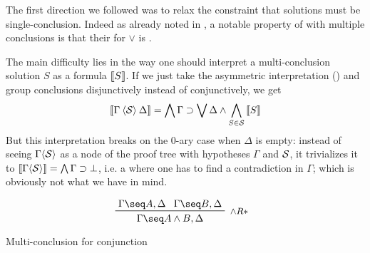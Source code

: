 \begin{scope}
The first direction we followed was to relax the constraint that solutions must
be single-conclusion. Indeed as already noted in , a
notable property of  with multiple conclusions is that their
 for $\lor$ is .

The main difficulty lies in the way one should interpret a multi-conclusion
solution $S$ as a formula $\left\llbracket S \right\rrbracket$. If we just take the asymmetric
interpretation () and group conclusions disjunctively instead of
conjunctively, we get
$$
\left\llbracket \Gamma \mathbin{\langle \mathcal{S} \rangle} \Delta \right\rrbracket =
\bigwedge \Gamma \supset \bigvee \Delta \land \bigwedge_{S \in \mathcal{S}}{\left\llbracket S \right\rrbracket}
$$
But this interpretation breaks on the 0-ary case when $\Delta$ is empty: instead
of seeing $\Gamma \mathbin{\langle \mathcal{S} \rangle}$ as a node of the proof tree with hypotheses
$\Gamma$ and  $\mathcal{S}$, it trivializes it to $\left\llbracket \Gamma
\mathbin{\langle \mathcal{S} \rangle} \right\rrbracket = \bigwedge \Gamma \supset \bot$, i.e. a  where one has to
find a contradiction in $\Gamma$; which is obviously not what we have in mind.

\begin{marginfigure}
  $$
  \R[\land R*]
    {\Gamma \seq A, \Delta}
    {\Gamma \seq B, \Delta}
    {\Gamma \seq A \land B, \Delta}
  $$
  \caption{Multi-conclusion  for conjunction}
\end{marginfigure}


\end{scope}
